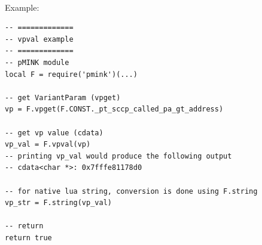 \documentclass[a4paper,latin]{paper}
\begin{document}
\\

\noindent{}Example:
\begin{lstlisting}[style=LuaInputStyle, belowskip=\baselineskip, upquote=true]
-- =============
-- vpval example 
-- =============
-- pMINK module
local F = require('pmink')(...)

-- get VariantParam (vpget)
vp = F.vpget(F.CONST._pt_sccp_called_pa_gt_address)

-- get vp value (cdata)
vp_val = F.vpval(vp)
-- printing vp_val would produce the following output
-- cdata<char *>: 0x7fffe81178d0

-- for native lua string, conversion is done using F.string
vp_str = F.string(vp_val)

-- return
return true
\end{lstlisting}
\clearpage
\end{document}
